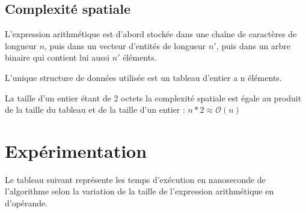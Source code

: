 \subsection{Complexité spatiale}
L'expression arithmétique est d'abord stockée dans une chaîne de caractères de longueur $n$, puis dans un vecteur d'entités de longueur $n'$, puis dans un arbre binaire qui contient lui aussi $n'$ éléments.
\par
L'unique structure de données utilisée est un tableau d'entier a n éléments. 
\par
La taille d'un entier étant de 2 octets la complexité spatiale est égale au produit de la taille du tableau et de la taille d'un entier : $n * 2 \approx \mathcal{O}(n)$
\par

\section{Expérimentation}
Le tableau suivant représente les temps d'exécution en nanoseconde de l'algorithme selon la variation de la taille de l'expression arithmétique en d'opérande.\\ \\
\small
